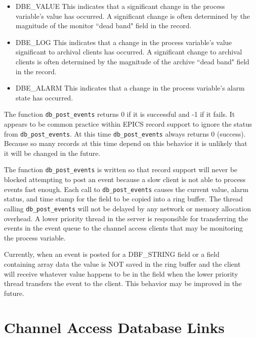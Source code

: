 \begin{itemize}
\item DBE\_VALUE This indicates that a significant change in the process variable's value has occurred.
A significant change is often determined by the magnitude of the monitor ``dead band" field in the record.

\item DBE\_LOG This indicates that a change in the process variable's value significant to archival clients has occurred.
A significant change to archival clients is often determined by the magnitude of the archive ``dead band" field in the record.

\item DBE\_ALARM This indicates that a change in the process variable's alarm state has occurred.

\end{itemize}

The function \verb|db_post_events| returns 0 if it is successful and -1 if it fails.
It appears to be common practice within EPICS record support to ignore the status from \verb|db_post_events|.
At this time \verb|db_post_events| always returns 0 (success).
Because so many records at this time depend on this behavior it is unlikely that it will be changed in the future.

The function \verb|db_post_events| is written so that record support will never be blocked attempting to post an event because a slow client is not able to process events fast enough.
Each call to \verb|db_post_events| causes the current value, alarm status, and time stamp for the field to be copied into a ring buffer.
The thread calling \verb|db_post_events| will not be delayed by any network or memory allocation overhead.
A lower priority thread in the server is responsible for transferring the events in the event queue to the channel access clients that may be monitoring the process variable.

Currently, when an event is posted for a DBF\_STRING field or a field containing array data the value is NOT saved in the ring buffer and the client will receive whatever value happens to be in the field when the lower priority thread transfers 
the event to the client.
This behavior may be improved in the future.

\section{Channel Access Database Links}


